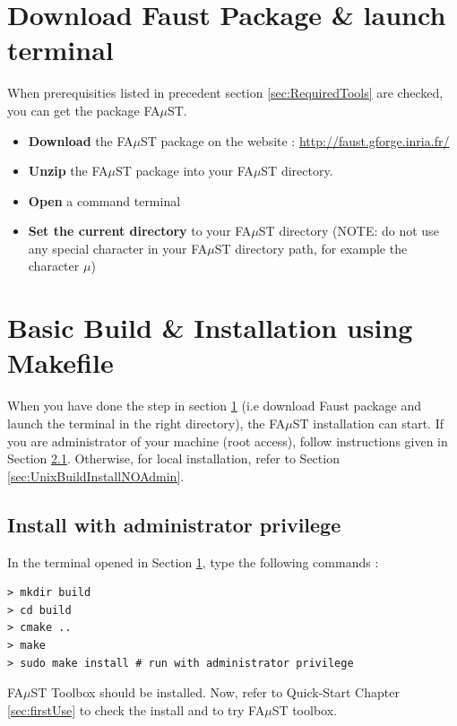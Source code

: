 \section{Download Faust Package \& launch terminal}\label{sec:UnixBuildDownload}

When prerequisities listed in precedent section \ref{sec:RequiredTools} are checked, you can get the package FA$\mu$ST.
\begin{itemize}
\item \textbf{Download} the FA$\mu$ST package on the website :  \url{http://faust.gforge.inria.fr/}
\item \textbf{Unzip} the FA$\mu$ST package into your FA$\mu$ST directory.
\item \textbf{Open} a command terminal
\item \textbf{Set the current directory} to your FA$\mu$ST directory (NOTE: do not use any special character in your FA$\mu$ST directory path, for example the character $\mu$)
\end{itemize}



\section{Basic Build \& Installation using Makefile}\label{sec:UnixBuildInstall}

When you have done the step in section \ref{sec:UnixBuildDownload} (i.e download Faust package and launch the terminal in the right directory),  the FA$\mu$ST installation can start.
If you are administrator of your machine (root access), follow instructions given in Section \ref{sec:UnixBuildInstallAdmin}. Otherwise, for local installation, refer to Section \ref{sec:UnixBuildInstallNOAdmin}. 

\subsection{Install with administrator privilege}\label{sec:UnixBuildInstallAdmin}
In the terminal opened in Section 
\ref{sec:UnixBuildDownload}, type the following commands : 
\lstset{style=customBash}
\begin{lstlisting}
> mkdir build
> cd build
> cmake ..
> make
> sudo make install # run with administrator privilege
\end{lstlisting}

FA$\mu$ST Toolbox should be installed. Now, refer to Quick-Start Chapter \ref{sec:firstUse} to check the install and to try FA$\mu$ST toolbox.

